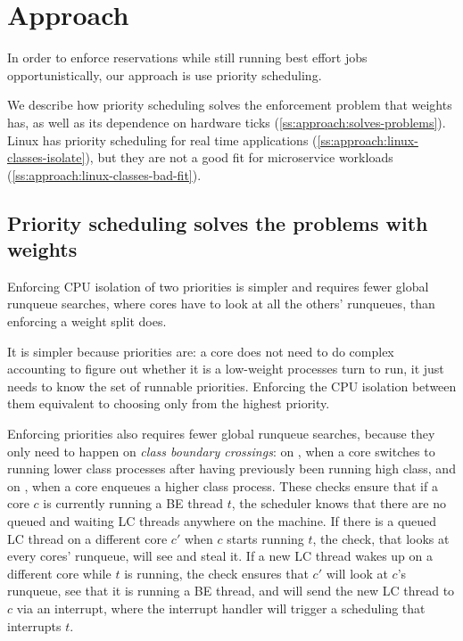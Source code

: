 \section{Approach}\label{s:approach}

In order to enforce reservations while still running best effort jobs
opportunistically, our approach is use priority scheduling.

We describe how priority scheduling solves the enforcement problem that weights
has, as well as its dependence on hardware ticks
(\autoref{ss:approach:solves-problems}). Linux has priority scheduling for real
time applications (\autoref{ss:approach:linux-classes-isolate}), but they are
not a good fit for microservice workloads
(\autoref{ss:approach:linux-classes-bad-fit}).

\subsection{Priority scheduling solves the problems with
weights}\label{ss:approach:solves-problems}

Enforcing CPU isolation of two priorities is simpler and requires fewer global
runqueue searches, where cores have to look at all the others' runqueues, than
enforcing a weight split does. 

It is simpler because priorities are: a core does not need to do complex
accounting to figure out whether it is a low-weight processes turn to run, it
just needs to know the set of runnable priorities. Enforcing the CPU isolation
between them equivalent to choosing only from the highest priority.

Enforcing priorities also requires fewer global runqueue searches, because they
only need to happen on \textit{class boundary crossings}: on \exit{}, when a
core switches to running lower class processes after having previously been
running high class, and on \entry{}, when a core enqueues a higher class
process. These checks ensure that if a core $c$ is currently running a BE thread
$t$, the scheduler knows that there are no queued and waiting LC threads
anywhere on the machine. If there is a queued LC thread on a different core $c'$
when $c$ starts running $t$, the \exit{} check, that looks at every cores'
runqueue, will see and steal it. If a new LC thread wakes up on a different core
while $t$ is running, the \entry{} check ensures that $c'$ will look at $c$'s
runqueue, see that it is running a BE thread, and will send the new LC thread to
$c$ via an interrupt, where the interrupt handler will trigger a scheduling that
interrupts $t$.


